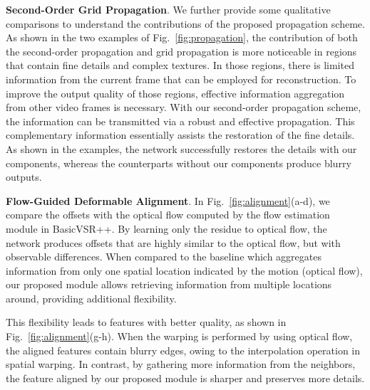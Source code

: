 \documentclass[10pt,twocolumn,letterpaper]{article}
\begin{document}
\noindent
\textbf{Second-Order Grid Propagation}.
We further provide some qualitative comparisons to understand the contributions of the proposed propagation scheme.
As shown in the two examples of Fig.~\ref{fig:propagation}, the contribution of both the second-order propagation and grid propagation is more noticeable in regions that contain fine details and complex textures.
In those regions, there is limited information from the current frame that can be employed for reconstruction. To improve the output quality of those regions, effective information aggregation from other video frames is necessary.
With our second-order propagation scheme, the information can be transmitted via a robust and effective propagation. This complementary information essentially assists the restoration of the fine details. As shown in the examples, the network successfully restores the details with our components, whereas the counterparts without our components produce blurry outputs.

\noindent
\textbf{Flow-Guided Deformable Alignment}.
In Fig.~\ref{fig:alignment}(a-d), we compare the offsets with the optical flow computed by the flow estimation module in BasicVSR++.
By learning only the residue to optical flow, the network produces offsets that are highly similar to the optical flow, but with observable differences. When compared to the baseline which aggregates information from only one spatial location indicated by the motion (optical flow), our proposed module allows retrieving information from multiple locations around, providing additional flexibility.

This flexibility leads to features with better quality, as shown in Fig.~\ref{fig:alignment}(g-h). When the warping is performed by using optical flow, the aligned features contain blurry edges, owing to the interpolation operation in spatial warping. In contrast, by gathering more information from the neighbors, the feature aligned by our proposed module is sharper and preserves more details.
\end{document}
